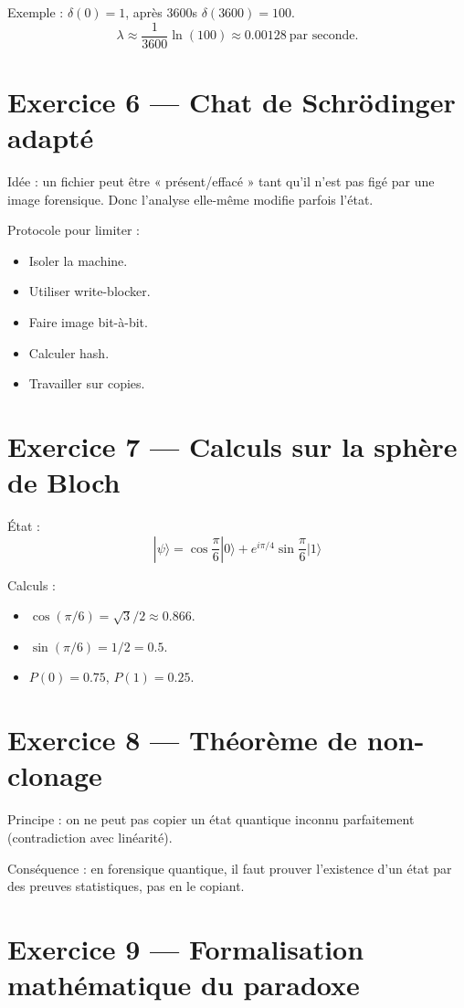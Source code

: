 \documentclass[12pt,a4paper]{article}
\begin{document}
	Exemple :  
	$\delta(0)=1$, après 3600s $\delta(3600)=100$.  
	\[
	\lambda \approx \frac{1}{3600}\ln(100) \approx 0.00128 \ \text{par seconde}.
	\]
	
	\section*{Exercice 6 — Chat de Schrödinger adapté}
	
	Idée : un fichier peut être « présent/effacé » tant qu’il n’est pas figé par une image forensique.  
	Donc l’analyse elle-même modifie parfois l’état.  
	
	Protocole pour limiter :  
	\begin{itemize}
		\item Isoler la machine.
		\item Utiliser write-blocker.
		\item Faire image bit-à-bit.
		\item Calculer hash.
		\item Travailler sur copies.
	\end{itemize}
	
	\section*{Exercice 7 — Calculs sur la sphère de Bloch}
	
	État :  
	\[
	|\psi\rangle = \cos\frac{\pi}{6}|0\rangle + e^{i\pi/4}\sin\frac{\pi}{6}|1\rangle
	\]
	
	Calculs :  
	\begin{itemize}
		\item $\cos(\pi/6) = \sqrt{3}/2 \approx 0.866$.
		\item $\sin(\pi/6) = 1/2 = 0.5$.
		\item $P(0) = 0.75$, $P(1) = 0.25$.
	\end{itemize}
	
	\section*{Exercice 8 — Théorème de non-clonage}
	
	Principe : on ne peut pas copier un état quantique inconnu parfaitement (contradiction avec linéarité).  
	
	Conséquence : en forensique quantique, il faut prouver l’existence d’un état par des preuves statistiques, pas en le copiant.  
	
	\section*{Exercice 9 — Formalisation mathématique du paradoxe}
	
\end{document}

